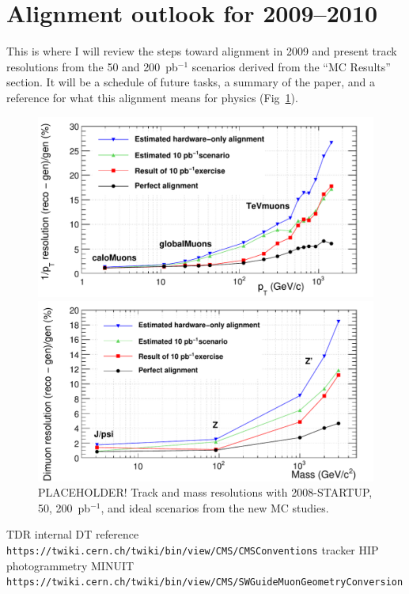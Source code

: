 \documentclass[12pt]{article}
\begin{document}
\section{Alignment outlook for 2009--2010}

This is where I will review the steps toward alignment in 2009 and
present track resolutions from the 50 and 200~pb$^{-1}$ scenarios
derived from the ``MC Results'' section.  It will be a schedule of
future tasks, a summary of the paper, and a reference for what this
alignment means for physics (Fig~\ref{fig:curvature_resolution}).

\begin{figure}
\begin{center}
\includegraphics[width=0.75\linewidth]{curvature_resolution.pdf}

\includegraphics[width=0.75\linewidth]{mass_resolution.pdf}
\end{center}
\caption{PLACEHOLDER!  Track and mass resolutions with 2008-STARTUP, 50, 200~pb$^{-1}$, and ideal scenarios from the new MC studies. \label{fig:curvature_resolution}}
\end{figure}

\begin{thebibliography}{99}

 TDR
 internal DT reference
 {\tt https://twiki.cern.ch/twiki/bin/view/CMS/CMSConventions}
 tracker HIP
 photogrammetry
 MINUIT
 {\tt https://twiki.cern.ch/twiki/bin/view/CMS/SWGuideMuonGeometryConversion}

\end{thebibliography}
\end{document}
